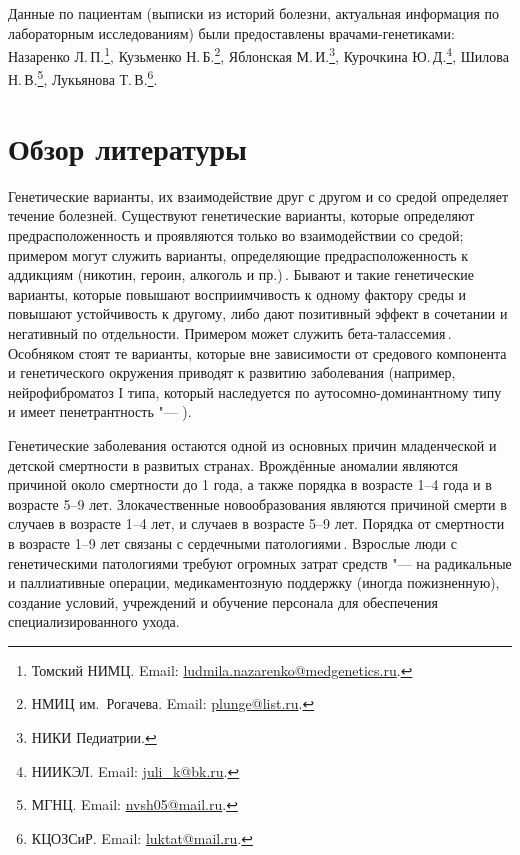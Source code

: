 \documentclass[a4paper,14pt]{extarticle}
\newcommand{\ecitep}[1]{\textenglish{\citep{#1}}}
\begin{document}
Данные по пациентам (выписки из историй болезни, актуальная информация по лабораторным исследованиям) были предоставлены врачами\hyp{}генетиками:
Назаренко Л.\,П.\footnote{Томский НИМЦ. Email: \href{mailto:ludmila.nazarenko@medgenetics.ru}{ludmila.nazarenko@medgenetics.ru}.},
Кузьменко Н.\,Б.\footnote{НМИЦ им.~Рогачева. Email: \href{mailto:plunge@list.ru}{plunge@list.ru}.},
Яблонская М.\,И.\footnote{НИКИ Педиатрии.},
Курочкина Ю.\,Д.\footnote{НИИКЭЛ. Email: \href{mailto:juli_k@bk.ru}{juli\_k@bk.ru}.},
Шилова Н.\,В.\footnote{МГНЦ. Email: \href{mailto:nvsh05@mail.ru}{nvsh05@mail.ru}.},
Лукьянова Т.\,В.\footnote{КЦОЗСиР. Email: \href{mailto:luktat@mail.ru}{luktat@mail.ru}.}.

\section{Обзор литературы}

Генетические варианты, их взаимодействие друг с другом и со средой определяет течение болезней.
Существуют генетические варианты, которые определяют предрасположенность и проявляются только во взаимодействии со средой; примером могут служить варианты, определяющие предрасположенность к аддикциям (никотин, героин, алкоголь и пр.)\,\ecitep{Hiroi_2004}.
Бывают и такие генетические варианты, которые повышают восприимчивость к одному фактору среды и повышают устойчивость к другому, либо дают позитивный эффект в сочетании и негативный по отдельности.
Примером может служить бета-талассемия\,\ecitep{Galanello_2010}.
Особняком стоят те варианты, которые вне зависимости от средового компонента и генетического окружения приводят к развитию заболевания (например, нейрофиброматоз I типа, который наследуется по аутосомно-доминантному типу и имеет  пенетрантность "--- \citealp{Jett_2009}).

Генетические заболевания остаются одной из основных причин младенческой и детской смертности в развитых странах.
Врождённые аномалии являются причиной около  смертности до 1 года, а также порядка  в возрасте 1--4 года и  в возрасте 5--9 лет.
Злокачественные новообразования являются причиной смерти в  случаев в возрасте 1--4 лет, и  случаев в возрасте 5--9 лет.
Порядка  от смертности в возрасте 1--9 лет связаны с сердечными патологиями\,\ecitep{Field_2003}.
Взрослые люди с генетическими патологиями требуют огромных затрат средств "--- на радикальные и паллиативные операции, медикаментозную поддержку (иногда пожизненную), создание условий, учреждений и обучение персонала для обеспечения специализированного ухода.
\end{document}

